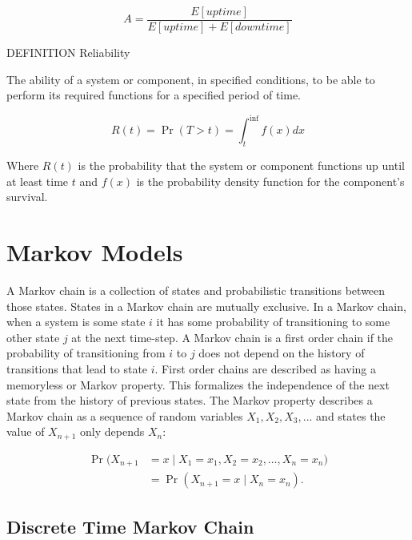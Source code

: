 \begin{equation}A = \frac{E[uptime]}{E[uptime]+E[downtime]}\end{equation}

DEFINITION Reliability

The ability of a system or component, in specified conditions, to be able to perform its required functions for a specified period of time.

\begin{equation}R(t) = \Pr(T > t) = \int_t^{\inf} f(x) dx\end{equation}

Where $R(t)$ is the probability that the system or component functions up until at least time $t$ and $f(x)$ is the probability density function for the component's survival.

\section{Markov Models}


A Markov chain is a collection of states and probabilistic transitions between those states.
States in a Markov chain are mutually exclusive.
In a Markov chain, when a system is some state $i$ it has some probability of transitioning to some other state $j$ at the next time-step.
A Markov chain is a first order chain if the probability of transitioning from $i$ to $j$ does not depend on the history of transitions that lead to state $i$.
First order chains are described as having a memoryless or Markov property.
This formalizes the independence of the next state from the history of previous states.
The Markov property describes a Markov chain as a sequence of random variables $X_{1}, X_{2}, X_{3}, ...$ and states the value of $X_{n+1}$ only depends $X_{n}$: \cite{MARKOV3}

\begin{align} \Pr(X_{n+1}&=x\mid X_1=x_1, X_2=x_2, \ldots, X_n=x_n)
\nonumber \\ &= \Pr(X_{n+1}=x\mid X_n=x_n). \end{align}

\subsection{Discrete Time Markov Chain}

